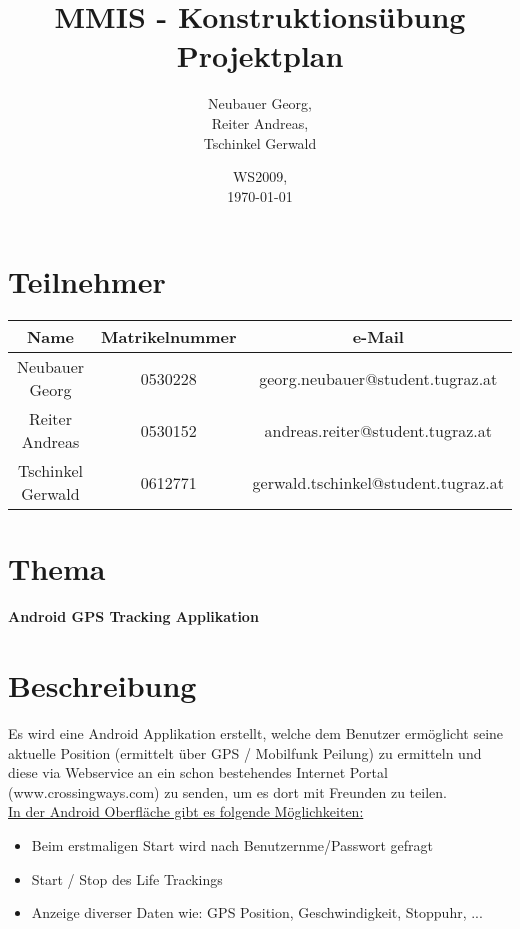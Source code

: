 \documentclass[a4paper,10pt]{article}
\begin{document}
\title{\textbf{MMIS - Konstruktionsübung  Projektplan}}
\author{ Neubauer Georg, \\
Reiter Andreas, \\
Tschinkel Gerwald
}
\date{WS2009, \\
\today{}}
\maketitle


\section{Teilnehmer}
\begin{tabular}{|ccc|}
\hline
Name & Matrikelnummer & e-Mail \\
\hline
Neubauer Georg & 0530228 & georg.neubauer@student.tugraz.at \\
Reiter Andreas & 0530152 & andreas.reiter@student.tugraz.at \\
Tschinkel Gerwald & 0612771 & gerwald.tschinkel@student.tugraz.at \\
\hline
\end{tabular}

\section{Thema}
\begin{center}
\Large{\textbf{Android GPS Tracking Applikation}}
\end{center}

\section{Beschreibung}
Es wird eine Android Applikation erstellt, welche dem Benutzer ermöglicht seine
aktuelle Position (ermittelt über GPS / Mobilfunk Peilung) zu ermitteln und diese
via Webservice an ein schon bestehendes Internet Portal (www.crossingways.com) zu
senden, um es dort mit Freunden zu teilen. \\

\underline{In der Android Oberfläche gibt es folgende Möglichkeiten:}
\begin{itemize}
\item Beim erstmaligen Start wird nach Benutzernme/Passwort gefragt
\item Start / Stop des Life Trackings
\item Anzeige diverser Daten wie: GPS Position, Geschwindigkeit, Stoppuhr, ...
\end{itemize}
\end{document}
